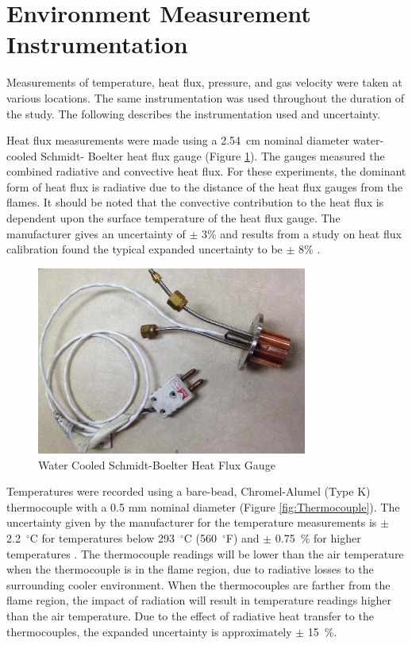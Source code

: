 \documentclass[12pt,oneside]{book}
\begin{document}
\clearpage

\section{Environment Measurement Instrumentation}

Measurements of temperature, heat flux, pressure, and gas velocity were taken at various locations. The same instrumentation was used throughout the duration of the study. The following describes the instrumentation used and uncertainty.

Heat flux measurements were made using a 2.54~cm nominal diameter water-cooled Schmidt- Boelter heat flux gauge (Figure \ref{fig:HeatFluxGauge}). The gauges measured the combined radiative and convective heat flux. For these experiments, the dominant form of heat flux is radiative due to the distance of the heat flux gauges from the flames. It should be noted that the convective contribution to the heat flux is dependent upon the surface temperature of the heat flux gauge. The manufacturer gives an uncertainty of $\pm$ 3\% and results from a study on heat flux calibration found the typical expanded uncertainty to be $\pm$ 8\% \cite{HeatFluxRoundRobin}. 

\begin{figure} [H]
	\centering
	\includegraphics[width = 3.5in]{0_Images/Instrumentation/Heat_Flux_Gauge.jpg}
	\caption{Water Cooled Schmidt-Boelter Heat Flux Gauge}
	\label{fig:HeatFluxGauge}
\end{figure}

Temperatures were recorded using a bare-bead, Chromel-Alumel (Type K) thermocouple with a 0.5 mm nominal diameter (Figure \ref{fig:Thermocouple}). The uncertainty given by the manufacturer for the temperature measurements is $\pm$ 2.2~$^\circ$C for temperatures below 293~$^\circ$C (560~$^\circ$F) and $\pm$ 0.75~\% for higher temperatures \cite{TemperatureHandbook}. The thermocouple readings will be lower than the air temperature when the thermocouple is in the flame region, due to radiative losses to the surrounding cooler environment. When the thermocouples are farther from the flame region, the impact of radiation will result in temperature readings higher than the air temperature. Due to the effect of radiative heat transfer to the thermocouples, the expanded uncertainty is approximately $\pm$ 15~\%.
\end{document}
